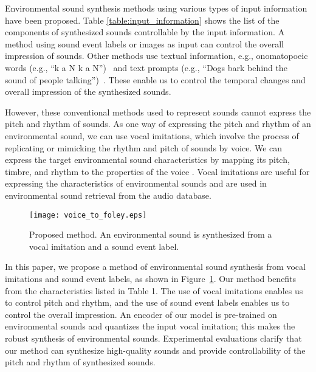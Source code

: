 \documentclass{article}
\begin{document}
Environmental sound synthesis methods using various types of input information have been proposed.
Table \ref{table:input_information} shows the list of the components of synthesized sounds controllable by the input information.
A method using sound event labels \cite{Kong_ICASSP2019,Liu_MLSP_2021} or images \cite{Zhou_CVPR_2018,Owens_CVPR_2016} as input can control the overall impression of sounds.
Other methods use textual information, e.g., onomatopoeic words (e.g., ``k a N k a N'')~\cite{okamoto_ATSIP_2022,ohnaka_arXiv_2022} and text prompts (e.g., ``Dogs bark behind the sound of people talking'')~\cite{Yang_arXiv_2022,Kreuk_ICLR_2023,Liu_arXiv_2023}.
These enable us to control the temporal changes and overall impression of the synthesized sounds.

However, these conventional methods used to represent sounds cannot express the pitch and rhythm of sounds.
As one way of expressing the pitch and rhythm of an environmental sound, we can use vocal imitations, which involve the process of replicating or mimicking the rhythm and pitch of sounds by voice.
We can express the target environmental sound characteristics by mapping its pitch, timbre, and rhythm to the properties of the voice \cite{Cartwright_CHI_2015}.
Vocal imitations are useful for expressing the characteristics of environmental sounds and are used in environmental sound retrieval \cite{Kim_DCASE_2018,Zhang_TASLP_2018,Cartwright_ICM_2014} from the audio database.

%
%

%
\begin{figure}[t!]
\centering
\texttt{[image: voice\_to\_foley.eps]}
\vspace{-6pt}
\caption{Proposed method. An environmental sound is synthesized from a vocal imitation and a sound event label.}
\label{fig:overview}
\end{figure}

%
In this paper, we propose a method of environmental sound synthesis from vocal imitations and sound event labels, as shown in Figure~\ref{fig:overview}.
Our method benefits from the characteristics listed in Table 1.
The use of vocal imitations enables us to control pitch and rhythm, and the use of sound event labels enables us to control the overall impression.
An encoder of our model is pre-trained on environmental sounds and quantizes the input vocal imitation; this makes the robust synthesis of environmental sounds.
Experimental evaluations clarify that our method can synthesize high-quality sounds and provide controllability of the pitch and rhythm of synthesized sounds.
\end{document}
